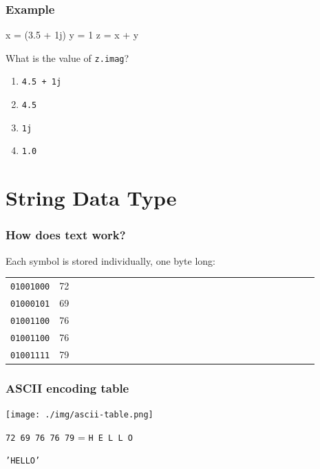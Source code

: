 \documentclass[11pt]{beamer}
\begin{document}
\begin{frame}[fragile]
  \frametitle{Example}
  \Enlarge

  \begin{semiverbatim}
x = (3.5 + 1j)
y = 1
z = x + y
  \end{semiverbatim}
  What is the value of \texttt{z.imag}? \pause
  \begin{enumerate}[label=\Alph*]
  \item  \texttt{4.5 + 1j}
  \item  \texttt{4.5}
  \item  \texttt{1j}
  \item  \texttt{1.0}
  \end{enumerate}
\end{frame}

\section{String Data Type}

\begin{frame}
  \frametitle{How does text work?}
  \Enlarge

  \begin{itemize}
  \myitem  Each symbol is stored individually, one byte long: \\
    \begin{tabular}{*{27}{l}}
      \texttt{01001000} & 72 \\
      \texttt{01000101} & 69 \\
      \texttt{01001100} & 76 \\
      \texttt{01001100} & 76 \\
      \texttt{01001111} & 79 \\
    \end{tabular}
  \end{itemize}
\end{frame}

\begin{frame}
  \frametitle{ASCII encoding table}
  \Enlarge
  \texttt{[image: ./img/ascii-table.png]} \pause

  \texttt{72 69 76 76 79} = \texttt{H E L L O} \pause

  \texttt{'HELLO'}
\end{frame}
\end{document}
